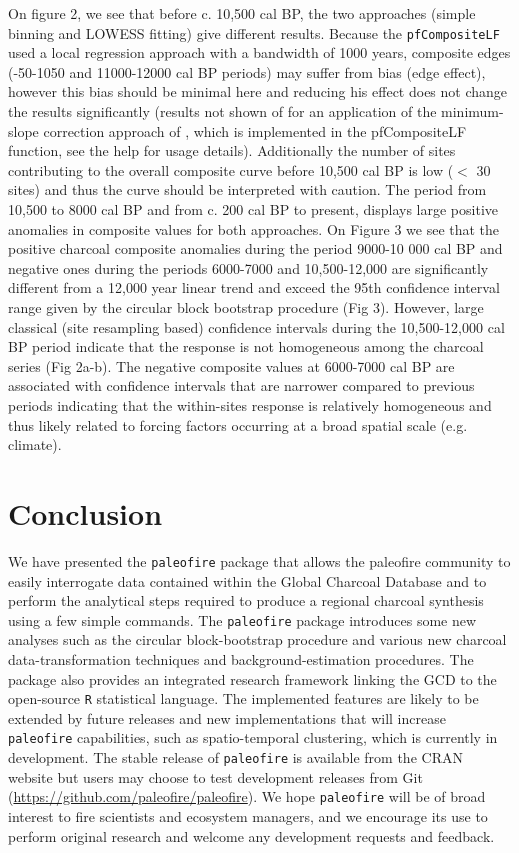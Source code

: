 \documentclass{elsarticle}
\begin{document}
On figure 2, we see that before c. 10,500 cal BP, the two approaches (simple binning and LOWESS fitting) give different results. Because the \texttt{pfCompositeLF} used a local regression approach with a bandwidth of 1000 years, composite edges (-50-1050 and 11000-12000 cal BP periods) may suffer from bias (edge effect), however this bias should be minimal here and reducing his effect does not change the results significantly (results not shown of for an application of the minimum-slope correction approach of  \citet{Mann2004,Mann2008}, which is implemented in the pfCompositeLF function, see the help for usage details). Additionally the number of sites contributing to the overall composite curve before 10,500 cal BP is low ($<$ 30 sites) and thus the curve should be interpreted with caution. The period from 10,500 to 8000 cal BP and from c. 200 cal BP to present, displays large positive anomalies in composite values for both approaches. On Figure 3 we see that the positive charcoal composite anomalies during the period 9000-10 000 cal BP and negative ones during the periods 6000-7000 and 10,500-12,000 are significantly different from a 12,000 year linear trend and exceed the 95th confidence interval range given by the circular block bootstrap procedure (Fig 3). However, large classical (site resampling based) confidence intervals during the 10,500-12,000 cal BP period indicate that the response is not homogeneous among the charcoal series (Fig 2a-b). The negative composite values at 6000-7000 cal BP are associated with confidence intervals that are narrower compared to previous periods indicating that the within-sites response is relatively homogeneous and thus likely related to forcing factors occurring at a broad spatial scale (e.g. climate). 

\section{Conclusion}

We have presented the \texttt{paleofire} package that allows the paleofire community to easily interrogate data contained within the Global Charcoal Database and to perform the analytical steps required to produce a regional charcoal synthesis using a few simple commands. The \texttt{paleofire} package introduces some new analyses such as the circular block-bootstrap procedure and various new charcoal data-transformation techniques and background-estimation procedures. The package also provides an integrated research framework linking the GCD to the open-source \texttt{R} statistical language. The implemented features are likely to be extended by future releases and new implementations that will increase \texttt{paleofire} capabilities, such as spatio-temporal clustering, which is currently in development. The stable release of \texttt{paleofire} is available from the CRAN website but users may choose to test development releases from Git (\url{https://github.com/paleofire/paleofire}). We hope \texttt{paleofire} will be of broad interest to fire scientists and ecosystem managers, and we encourage its use to perform original research and welcome any development requests and feedback.     
\end{document}
